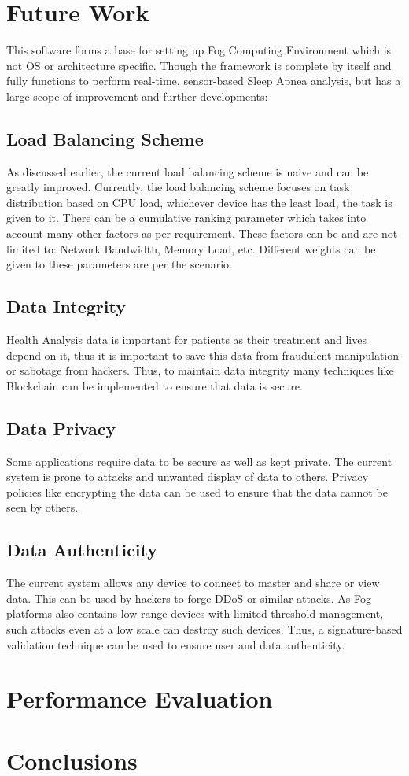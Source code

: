 \documentclass[AMA,STIX1COL]{WileyNJD-v2}
\begin{document}
\section{Future Work}
This software forms a base for setting up Fog Computing Environment which is not OS or architecture specific. Though the framework is complete by itself and fully functions to perform real-time, sensor-based Sleep Apnea analysis, but has a large scope of improvement and further developments:

\subsection{Load Balancing Scheme}
As discussed earlier, the current load balancing scheme is naive and can be greatly improved. Currently, the load balancing scheme focuses on task distribution based on CPU load, whichever device has the least load, the task is given to it. There can be a cumulative ranking parameter which takes into account many other factors as per requirement. These factors can be and are not limited to: Network Bandwidth, Memory Load, etc. Different weights can be given to these parameters are per the scenario. 

\subsection{Data Integrity}
Health Analysis data is important for patients as their treatment and lives depend on it, thus it is important to save this data from fraudulent manipulation or sabotage from hackers. Thus, to maintain data integrity many techniques like Blockchain can be implemented to ensure that data is secure. 

\subsection{Data Privacy}
Some applications require data to be secure as well as kept private. The current system is prone to attacks and unwanted display of data to others. Privacy policies like encrypting the data can be used to ensure that the data cannot be seen by others. 

\subsection{Data Authenticity}
The current system allows any device to connect to master and share or view data. This can be used by hackers to forge DDoS or similar attacks. As Fog platforms also contains low range devices with limited threshold management, such attacks even at a low scale can destroy such devices. Thus, a signature-based validation technique can be used to ensure user and data authenticity.


\section{Performance Evaluation}

\section{Conclusions}



\end{document}
